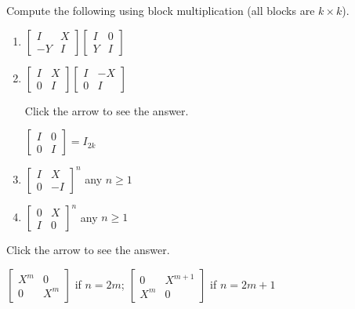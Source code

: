 \documentclass{ximera}
\begin{document}
\begin{problem}\label{prob:blockmatmult_vars}
Compute the following using block multiplication (all blocks are $k \times k$).

\begin{enumerate}
\item
$\left[ \begin{array}{rr}
I & X \\
-Y & I
\end{array} \right] \left[ \begin{array}{rr}
I & 0 \\
Y & I
\end{array} \right]
$

\item
$\left[ \begin{array}{rr}
I & X \\
0 & I
\end{array} \right] \left[ \begin{array}{rr}
I & -X \\
0 & I
\end{array} \right]
$

Click the arrow to see the answer.
\begin{expandable}
$\left[ \begin{array}{cc}
I & 0 \\
0 & I
\end{array} \right] = I_{2k}$
\end{expandable}

\item %
$\left[ \begin{array}{cc}
I & X \\
0 & -I
\end{array} \right]^{n}
$ any $n \geq 1$

\item %
$\left[ \begin{array}{cc}
0 & X \\
I & 0
\end{array} \right]^{n}
$ any $n \geq 1$
\end{enumerate}

Click the arrow to see the answer.
\begin{expandable}
$\left[ \begin{array}{cc}
X^{m} & 0 \\
0 & X^{m}
\end{array} \right]$ if $n = 2m$;
$\left[ \begin{array}{cc}
0 & X^{m + 1} \\
X^{m} & 0
\end{array} \right]$ if $n = 2m + 1$
\end{expandable}


\end{problem}
\end{document}
